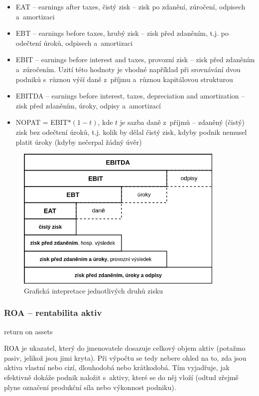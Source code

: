 \begin{itemize}
\item EAT -- earnings after taxes, čistý zisk -- zisk po zdanění, zúročení, odpisech a~amortizaci

\item EBT -- earnings before taxes, hrubý zisk -- zisk před zdaněním, t.j. po odečtení úroků, odpisech a~amortizaci

\item EBIT -- earnings before interest and taxes, provozní zisk -- zisk před zdaněním a~zúročením. Uzití této hodnoty je vhodné například při srovnávání dvou podniků s~různou výší daně z~příjmu a~různou kapitálovou strukturou

\item EBITDA -- earnings before interest, taxes, depreciation and amortization -- zisk před zdaněním, úroky, odpisy a~amortizací

\item NOPAT = EBIT$*(1-t)$, kde $t$ je sazba daně z~příjmů  -- zdaněný (čistý) zisk bez odečtení úroků, t.j. kolik by dělal čistý zisk, kdyby podnik nemusel platit úroky (kdyby nečerpal žádný úvěr)
\end{itemize}


\begin{figure}
  \centering
  \includegraphics[width=10cm]{img/zisk.png}
  \caption{Grafická intepretace jednotlivých druhů zisku}
\end{figure}

\subsubsection{ROA -- rentabilita aktiv}
return on assets

ROA je ukazatel, který do jmenovatele dosazuje celkový objem aktiv (potažmo pasiv, jelikož jsou jimi kryta). Při výpočtu se tedy nebere ohled na to, zda jsou aktiva vlastní nebo cizí, dlouhodobá nebo krátkodobá. Tím vyjadřuje, jak efektivně dokáže podnik naložit s~aktivy, které se do něj vloží (odtud zřejmě plyne označení produkční síla nebo výkonnost podniku).

